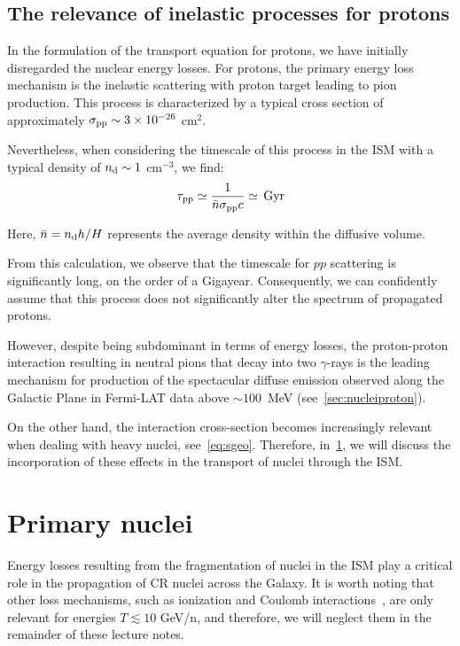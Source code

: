 \subsection{The relevance of inelastic processes for protons}

In the formulation of the transport equation for protons, we have initially disregarded the nuclear energy losses. For protons, the primary energy loss mechanism is the inelastic scattering with proton target leading to pion production. This process is characterized by a typical cross section of approximately $\sigma_{\rm pp}\sim 3\times 10^{-26}$ cm$^2$.

Nevertheless, when considering the timescale of this process in the ISM with a typical density of $n_{\rm d} \sim 1$ cm$^{-3}$, we find:
%
\begin{equation}
\tau_{\rm pp} \simeq \frac{1}{\bar{n}\sigma_{\rm pp}c} \simeq \, \text{Gyr}
\end{equation}

Here, $\bar{n} = n_{\rm d} h/H$ represents the average density within the diffusive volume.

From this calculation, we observe that the timescale for $pp$ scattering is significantly long, on the order of a Gigayear. Consequently, we can confidently assume that this process does not significantly alter the spectrum of propagated protons. 

However, despite being subdominant in terms of energy losses, the proton-proton interaction resulting in neutral pions that decay into two $\gamma$-rays is the leading mechanism for production of the spectacular diffuse emission observed along the Galactic Plane in Fermi-LAT data above $\sim 100$~MeV (see~\cref{sec:nucleiproton}).

On the other hand, the interaction cross-section becomes increasingly relevant when dealing with heavy nuclei, see~\cref{eq:sgeo}. Therefore, in~\cref{sec:nuclei}, we will discuss the incorporation of these effects in the transport of nuclei through the ISM.

\section{Primary nuclei}
\label{sec:nuclei}

Energy losses resulting from the fragmentation of nuclei in the ISM play a critical role in the propagation of CR nuclei across the Galaxy. It is worth noting that other loss mechanisms, such as ionization and Coulomb interactions~\cite{Serpicolecture}, are only relevant for energies $T \lesssim 10$ GeV/n, and therefore, we will neglect them in the remainder of these lecture notes.

